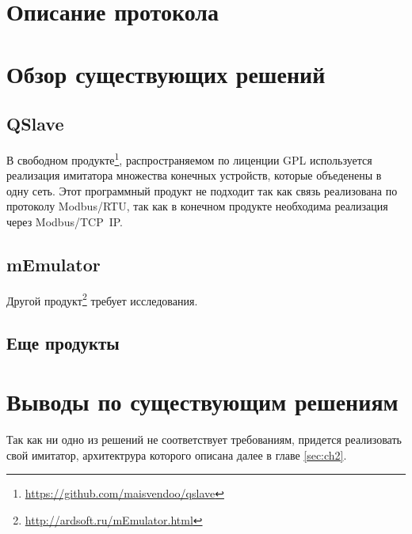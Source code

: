 \section{Описание протокола}

\section{Обзор существующих решений}\label{sec:ch1/sec1}
\subsection{QSlave}

В свободном продукте\footnote{\url{https://github.com/maisvendoo/qslave}}, распространяемом по лиценции GPL используется
реализация имитатора множества конечных устройств, которые объеденены в одну сеть.
Этот программный продукт не подходит так как связь реализована по протоколу
Modbus/RTU, так как в конечном продукте необходима реализация через Modbus/TCP~IP.

\subsection{mEmulator}
Другой продукт\footnote{\url{http://ardsoft.ru/mEmulator.html}} требует исследования.


\subsection{Еще продукты}


\section{Выводы по существующим решениям}

Так как ни одно из решений не соответствует требованиям, придется реализовать свой
имитатор, архитектрура которого описана далее в главе \ref{sec:ch2}.